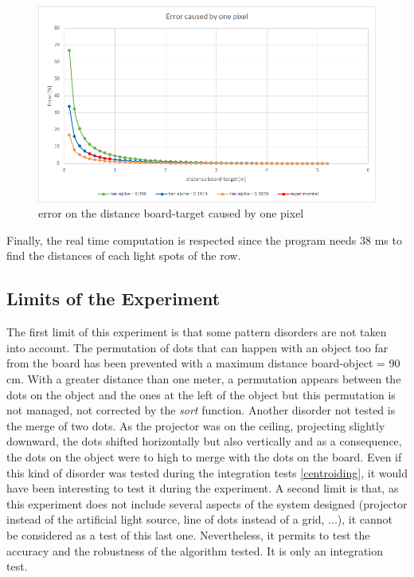 \begin{figure}[H]
  \centerline{\includegraphics[scale=0.7]{fig/error.png}}
  \caption{error on the distance board-target caused by one pixel}
  \label{fig:error}
\end{figure}

Finally, the real time computation is respected since the program needs 38 ms to find the distances of each light spots of the row. 

\subsection{Limits of the Experiment}
The first limit of this experiment is that some pattern disorders are not taken into account. The permutation of dots that can happen with an object too far from the board has been prevented with a maximum distance board-object = 90 cm. With a greater distance than one meter, a permutation appears between the dots on the object and the ones at the left of the object but this permutation is not managed, not corrected by the \emph{sort} function. Another disorder not tested is the merge of two dots. As the projector was on the ceiling, projecting slightly downward, the dots shifted horizontally but also vertically and as a consequence, the dots on the object were to high to merge with the dots on the board. Even if this kind of disorder was tested during the integration tests \ref{centroiding}, it would have been interesting to test it during the experiment.
A second limit is that, as this experiment does not include several aspects of the system designed (projector instead of the artificial light source, line of dots instead of a grid, ...), it cannot be considered as a test of this last one. Nevertheless, it permits to test the accuracy and the robustness of the algorithm tested. It is only an integration test.





